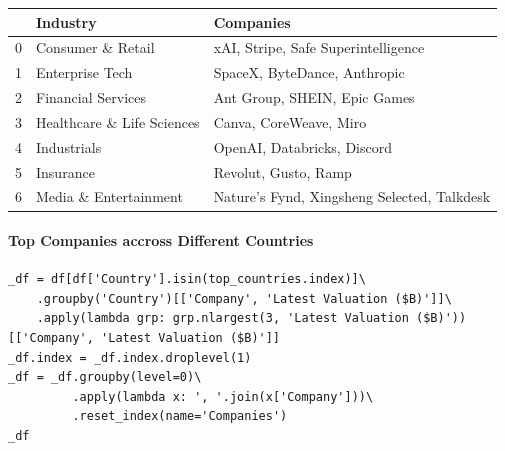 \documentclass[a4paper,12pt]{article}
\begin{document}
\begin{table}[htbp]
\label{}
\centering
\begin{tabular}{rll}
 & Industry & Companies\\
\hline
0 & Consumer \& Retail & xAI, Stripe, Safe Superintelligence\\
1 & Enterprise Tech & SpaceX, ByteDance, Anthropic\\
2 & Financial Services & Ant Group, SHEIN, Epic Games\\
3 & Healthcare \& Life Sciences & Canva, CoreWeave, Miro\\
4 & Industrials & OpenAI, Databricks, Discord\\
5 & Insurance & Revolut, Gusto, Ramp\\
6 & Media \& Entertainment & Nature's Fynd, Xingsheng Selected, Talkdesk\\
\end{tabular}
\end{table}
\newpage
\paragraph{Top Companies accross Different Countries}
\label{sec:orge9b3aac}
\begin{verbatim}
_df = df[df['Country'].isin(top_countries.index)]\
    .groupby('Country')[['Company', 'Latest Valuation ($B)']]\
    .apply(lambda grp: grp.nlargest(3, 'Latest Valuation ($B)'))[['Company', 'Latest Valuation ($B)']]
_df.index = _df.index.droplevel(1)
_df = _df.groupby(level=0)\
         .apply(lambda x: ', '.join(x['Company']))\
         .reset_index(name='Companies')
_df
\end{verbatim}
\end{document}
